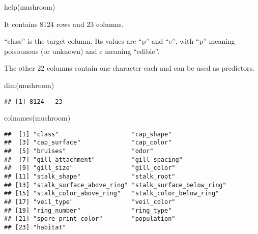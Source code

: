 \documentclass[
]{article}
\newenvironment{Shaded}{\begin{snugshade}}{\end{snugshade}}
\newcommand{\FunctionTok}[1]{\textcolor[rgb]{0.00,0.00,0.00}{#1}}
\newcommand{\NormalTok}[1]{#1}
\newcommand{\SpecialCharTok}[1]{\textcolor[rgb]{0.00,0.00,0.00}{#1}}
\begin{document}
\begin{Shaded}
\begin{Highlighting}[]
\FunctionTok{help}\NormalTok{(mushroom)}
\end{Highlighting}
\end{Shaded}

It contains 8124 rows and 23 columns.

``class'' is the target column. Its values are ``p'' and ``e'', with
``p'' meaning poisounous (or unknown) and e meaning ``edible''.

The other 22 columns contain one character each and can be used as
predictors.

\begin{Shaded}
\begin{Highlighting}[]
\FunctionTok{dim}\NormalTok{(mushroom)}
\end{Highlighting}
\end{Shaded}

\begin{verbatim}
## [1] 8124   23
\end{verbatim}

\begin{Shaded}
\begin{Highlighting}[]
\FunctionTok{colnames}\NormalTok{(mushroom)}
\end{Highlighting}
\end{Shaded}

\begin{verbatim}
##  [1] "class"                    "cap_shape"               
##  [3] "cap_surface"              "cap_color"               
##  [5] "bruises"                  "odor"                    
##  [7] "gill_attachment"          "gill_spacing"            
##  [9] "gill_size"                "gill_color"              
## [11] "stalk_shape"              "stalk_root"              
## [13] "stalk_surface_above_ring" "stalk_surface_below_ring"
## [15] "stalk_color_above_ring"   "stalk_color_below_ring"  
## [17] "veil_type"                "veil_color"              
## [19] "ring_number"              "ring_type"               
## [21] "spore_print_color"        "population"              
## [23] "habitat"
\end{verbatim}

\begin{Shaded}
\end{Shaded}
\end{document}

